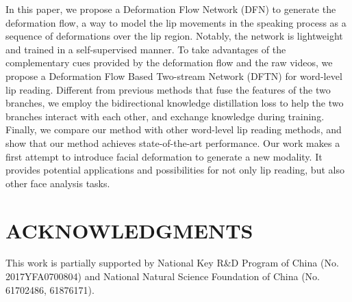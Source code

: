 \documentclass[a4paper, 10pt, conference]{ieeeconf}      \usepackage{FG2020}
\begin{document}
 In this paper, we propose a Deformation Flow Network (DFN) to generate the deformation flow, a way to model the lip movements in the speaking process as a sequence of deformations over the lip region.  
Notably, the network is lightweight and trained in a self-supervised manner. 
 To take advantages of the  complementary cues provided by the deformation flow and the raw videos, we propose a Deformation Flow Based Two-stream Network (DFTN) for word-level lip reading. Different from previous methods that fuse the features of the two branches, we employ the bidirectional knowledge distillation loss to help the two branches interact with each other, and exchange knowledge during training. 
Finally, we compare our method with other word-level lip reading methods, and show that our method achieves state-of-the-art performance. 
 Our work makes a first attempt to introduce facial deformation to generate a new modality. It provides potential applications and possibilities for not only lip reading, but also other face analysis tasks. 
 
 \section{ACKNOWLEDGMENTS}

This work is partially supported by National Key R\&D Program of China (No. 2017YFA0700804) and National Natural Science Foundation of China (No. 61702486, 61876171).

 
 
 
 
 
\end{document}
